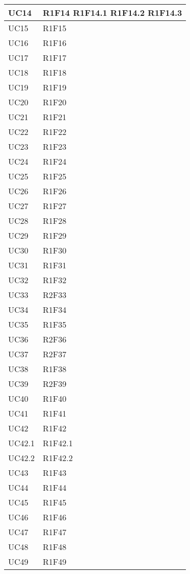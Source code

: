 \begin{center}
\begin{longtable}{|p{44mm}|p{22mm}|}
\hline
UC14 &
R1F14 \newline
R1F14.1 \newline
R1F14.2 \newline
R1F14.3 
\\
\hline
UC15 &
R1F15 
\\
\hline
UC16 &
R1F16 
\\
\hline
UC17 &
R1F17 
\\
\hline
UC18 &
R1F18 
\\
\hline
UC19 &
R1F19 
\\
\hline
UC20 &
R1F20 
\\
\hline
UC21 &
R1F21 
\\
\hline
UC22 &
R1F22 
\\
\hline
UC23 &
R1F23 
\\
\hline
UC24 &
R1F24 
\\
\hline
UC25 &
R1F25 
\\
\hline
UC26 &
R1F26 
\\
\hline
UC27 &
R1F27 
\\
\hline
UC28 &
R1F28 
\\
\hline
UC29 &
R1F29 
\\
\hline
UC30 &
R1F30 
\\
\hline
UC31 &
R1F31 
\\
\hline
UC32 &
R1F32 
\\
\hline
UC33 &
R2F33 
\\
\hline
UC34 &
R1F34 
\\
\hline
UC35 &
R1F35 
\\
\hline
UC36 &
R2F36 
\\
\hline
UC37 &
R2F37 
\\
\hline
UC38 &
R1F38 
\\
\hline
UC39 &
R2F39 
\\
\hline
UC40 &
R1F40 
\\
\hline
UC41 &
R1F41 
\\
\hline
UC42 &
R1F42 
\\
\hline
UC42.1 &
R1F42.1 
\\
\hline
UC42.2 &
R1F42.2 
\\
\hline
UC43 &
R1F43 
\\
\hline
UC44 &
R1F44 
\\
\hline
UC45 &
R1F45 
\\
\hline
UC46 &
R1F46 
\\
\hline
UC47 &
R1F47 
\\
\hline
UC48 &
R1F48 
\\
\hline
UC49 &
R1F49 
\\

\end{longtable}
\end{center}
